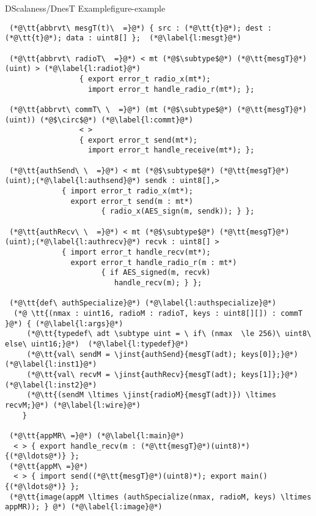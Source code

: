 \begin{fpfig}[!p]{DScalaness/DnesT Example}{figure-example}
{
\singlespace
\lstset{numbers=left, numberstyle=\tiny, numbersep=0pt, basicstyle=\ttfamily}
\begin{lstlisting}
 (*@\tt{abbrvt\ mesgT(t)\  =}@*) { src : (*@\tt{t}@*); dest : (*@\tt{t}@*); data : uint8[] };  (*@\label{l:mesgt}@*)

 (*@\tt{abbrvt\ radioT\  =}@*) < mt (*@$\subtype$@*) (*@\tt{mesgT}@*)(uint) > (*@\label{l:radiot}@*)
                 { export error_t radio_x(mt*); 
                   import error_t handle_radio_r(mt*); };

 (*@\tt{abbrvt\ commT\ \  =}@*) (mt (*@$\subtype$@*) (*@\tt{mesgT}@*)(uint)) (*@$\circ$@*) (*@\label{l:commt}@*)
                 < >
                 { export error_t send(mt*); 
                   import error_t handle_receive(mt*); };

 (*@\tt{authSend\ \  =}@*) < mt (*@$\subtype$@*) (*@\tt{mesgT}@*)(uint);(*@\label{l:authsend}@*) sendk : uint8[],>  
             { import error_t radio_x(mt*);
               export error_t send(m : mt*) 
                      { radio_x(AES_sign(m, sendk)); } };

 (*@\tt{authRecv\ \  =}@*) < mt (*@$\subtype$@*) (*@\tt{mesgT}@*)(uint);(*@\label{l:authrecv}@*) recvk : uint8[] >  
             { import error_t handle_recv(mt*);
               export error_t handle_radio_r(m : mt*) 
                      { if AES_signed(m, recvk) 
                         handle_recv(m); } }; 

 (*@\tt{def\ authSpecialize}@*) (*@\label{l:authspecialize}@*)
  (*@ \tt{(nmax : uint16, radioM : radioT, keys : uint8[][]) : commT }@*) { (*@\label{l:args}@*)
     (*@\tt{typedef\ adt \subtype uint = \ if\ (nmax  \le 256)\ uint8\ else\ uint16;}@*)  (*@\label{l:typedef}@*) 
     (*@\tt{val\ sendM = \jinst{authSend}{mesgT(adt); keys[0]};}@*)  (*@\label{l:inst1}@*)
     (*@\tt{val\ recvM = \jinst{authRecv}{mesgT(adt); keys[1]};}@*)  (*@\label{l:inst2}@*)    
     (*@\tt{(sendM \ltimes \jinst{radioM}{mesgT(adt)}) \ltimes recvM;}@*) (*@\label{l:wire}@*)
    }

 (*@\tt{appMR\ =}@*) (*@\label{l:main}@*)
  < > { export handle_recv(m : (*@\tt{mesgT}@*)(uint8)*) {(*@\ldots@*)} }; 
 (*@\tt{appM\ =}@*) 
  < > { import send((*@\tt{mesgT}@*)(uint8)*); export main() {(*@\ldots@*)} };  
 (*@\tt{image(appM \ltimes (authSpecialize(nmax, radioM, keys) \ltimes appMR)); } @*) (*@\label{l:image}@*)  
\end{lstlisting}
\primaryspacing
}
\end{fpfig}


